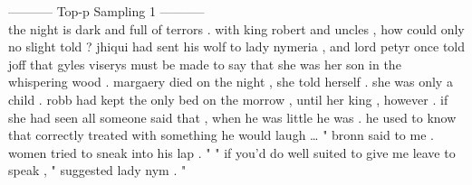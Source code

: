 \documentclass[12pt,article]{article}
\begin{document}
----------- Top-p Sampling 1 -----------\\
the night is dark and full of terrors . with king robert and uncles , how could only no slight told ? jhiqui had sent his wolf to lady nymeria , and lord petyr once told joff that gyles viserys must be made to say that she was her son in the whispering wood . margaery died on the night , she told herself . she was only a child . robb had kept the only bed on the morrow , until her king , however . if she had seen all someone said that , when he was little he was . he used to know that correctly treated with something he would laugh … " bronn said to me . women tried to sneak into his lap . " " if you'd do well suited to give me leave to speak , " suggested lady nym . "



\end{document}
